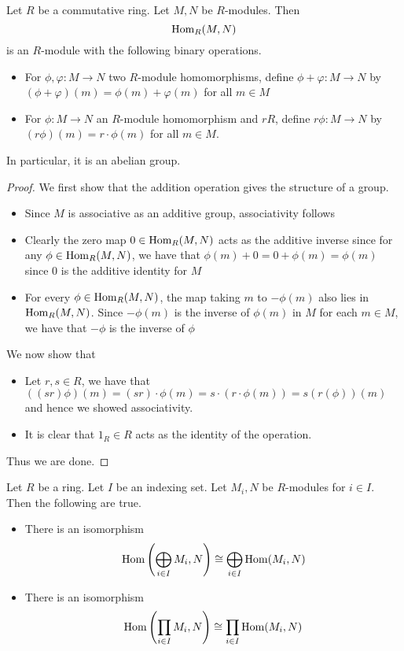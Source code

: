 \documentclass[a4paper]{article}
\begin{document}
\begin{prp}{}{} Let $R$ be a commutative ring. Let $M,N$ be $R$-modules. Then $$\operatorname{Hom}_R(M,N)$$ is an $R$-module with the following binary operations. 
\begin{itemize}
\item For $\phi,\varphi:M\to N$ two $R$-module homomorphisms, define $\phi+\varphi:M\to N$ by $(\phi+\varphi)(m)=\phi(m)+\varphi(m)$ for all $m\in M$
\item For $\phi:M\to N$ an $R$-module homomorphism and $r R$, define $r\phi:M\to N$ by $(r\phi)(m)=r\cdot\phi(m)$ for all $m\in M$. 
\end{itemize} 
In particular, it is an abelian group. \tcbline
\begin{proof}
We first show that the addition operation gives the structure of a group. 
\begin{itemize}
\item Since $M$ is associative as an additive group, associativity follows
\item Clearly the zero map $0\in\operatorname{Hom}_R(M,N)$ acts as the additive inverse since for any $\phi\in\operatorname{Hom}_R(M,N)$, we have that $\phi(m)+0=0+\phi(m)=\phi(m)$ since $0$ is the additive identity for $M$
\item For every $\phi\in\operatorname{Hom}_R(M,N)$, the map taking $m$ to $-\phi(m)$ also lies in $\operatorname{Hom}_R(M,N)$. Since $-\phi(m)$ is the inverse of $\phi(m)$ in $M$ for each $m\in M$, we have that $-\phi$ is the inverse of $\phi$
\end{itemize}
We now show that 
\begin{itemize}
\item Let $r,s\in R$, we have that $((sr)\phi)(m)=(sr)\cdot\phi(m)=s\cdot(r\cdot\phi(m))=s(r(\phi))(m)$ and hence we showed associativity. 
\item It is clear that $1_R\in R$ acts as the identity of the operation. 
\end{itemize}
Thus we are done. 
\end{proof}
\end{prp}

\begin{prp}{}{} Let $R$ be a ring. Let $I$ be an indexing set. Let $M_i,N$ be $R$-modules for $i\in I$. Then the following are true. 
\begin{itemize}
\item There is an isomorphism $$\operatorname{Hom}\left(\bigoplus_{i\in I}M_i,N\right)\cong\bigoplus_{i\in I}\operatorname{Hom}(M_i,N)$$
\item There is an isomorphism $$\operatorname{Hom}\left(\prod_{i\in I}M_i,N\right)\cong\prod_{i\in I}\operatorname{Hom}(M_i,N)$$
\end{itemize} \tcbline
\end{prp}
\end{document}
